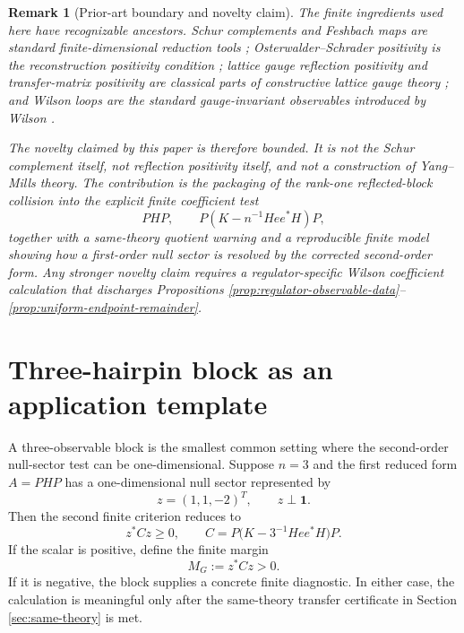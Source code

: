 \documentclass[11pt]{article}
\newtheorem{remark}[theorem]{Remark}
\newcommand{\one}{\mathbf 1}
\begin{document}
\begin{remark}[Prior-art boundary and novelty claim]
\label{rem:prior-art-boundary}
The finite ingredients used here have recognizable ancestors.  Schur complements and Feshbach maps are standard finite-dimensional reduction tools \cite{Feshbach1958,Feshbach1962}; Osterwalder--Schrader positivity is the reconstruction positivity condition \cite{OsterwalderSchrader1973,OsterwalderSchrader1975}; lattice gauge reflection positivity and transfer-matrix positivity are classical parts of constructive lattice gauge theory \cite{OsterwalderSeiler1978,Luscher1977,Seiler1982}; and Wilson loops are the standard gauge-invariant observables introduced by Wilson \cite{Wilson1974}.

The novelty claimed by this paper is therefore bounded.  It is not the Schur complement itself, not reflection positivity itself, and not a construction of Yang--Mills theory.  The contribution is the packaging of the rank-one reflected-block collision into the explicit finite coefficient test
\[
  PHP,\qquad
  P(K-n^{-1}Hee^*H)P,
\]
together with a same-theory quotient warning and a reproducible finite model showing how a first-order null sector is resolved by the corrected second-order form.  Any stronger novelty claim requires a regulator-specific Wilson coefficient calculation that discharges Propositions \ref{prop:regulator-observable-data}--\ref{prop:uniform-endpoint-remainder}.
\end{remark}

\section{Three-hairpin block as an application template}
\label{sec:three-hairpin-template}

A three-observable block is the smallest common setting where the second-order null-sector test can be one-dimensional.  Suppose \(n=3\) and the first reduced form \(A=PHP\) has a one-dimensional null sector represented by
\begin{equation}
  z=(1,1,-2)^T,
  \qquad z\perp\one.
  \label{eq:z-vector}
\end{equation}
Then the second finite criterion reduces to
\begin{equation}
  z^*Cz\ge0,
  \qquad
  C=P\bigl(K-3^{-1}Hee^*H\bigr)P.
  \label{eq:three-hairpin-criterion}
\end{equation}
If the scalar is positive, define the finite margin
\begin{equation}
  M_G:=z^*Cz>0.
  \label{eq:MG}
\end{equation}
If it is negative, the block supplies a concrete finite diagnostic.  In either case, the calculation is meaningful only after the same-theory transfer certificate in Section \ref{sec:same-theory} is met.
\end{document}
